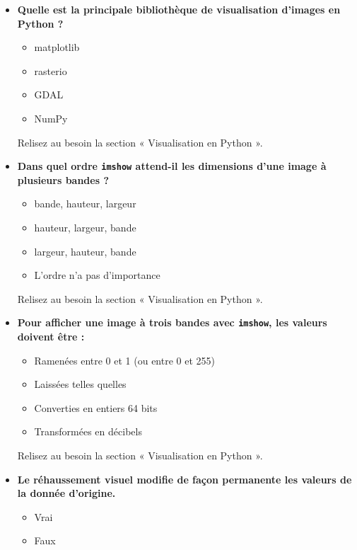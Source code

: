\documentclass[
  french,
  11pt,
  letterpaper,
  open=any,
  twoside=false,
  french]{scrbook}
\providecommand{\tightlist}{%
  \setlength{\itemsep}{0pt}\setlength{\parskip}{0pt}}
\begin{document}
\begin{itemize}
\item
  \textbf{Quelle est la principale bibliothèque de visualisation
  d'images en Python ?}

  \begin{itemize}
  \tightlist
  \item
    matplotlib
  \item
    rasterio
  \item
    GDAL
  \item
    NumPy
  \end{itemize}

  Relisez au besoin la section « Visualisation en Python ».
\item
  \textbf{Dans quel ordre \texttt{imshow} attend-il les dimensions d'une
  image à plusieurs bandes ?}

  \begin{itemize}
  \tightlist
  \item
    bande, hauteur, largeur
  \item
    hauteur, largeur, bande
  \item
    largeur, hauteur, bande
  \item
    L'ordre n'a pas d'importance
  \end{itemize}

  Relisez au besoin la section « Visualisation en Python ».
\item
  \textbf{Pour afficher une image à trois bandes avec \texttt{imshow},
  les valeurs doivent être :}

  \begin{itemize}
  \tightlist
  \item
    Ramenées entre 0 et 1 (ou entre 0 et 255)
  \item
    Laissées telles quelles
  \item
    Converties en entiers 64 bits
  \item
    Transformées en décibels
  \end{itemize}

  Relisez au besoin la section « Visualisation en Python ».
\item
  \textbf{Le réhaussement visuel modifie de façon permanente les valeurs
  de la donnée d'origine.}

  \begin{itemize}
  \tightlist
  \item
    Vrai
  \item
    Faux
  \end{itemize}


\end{itemize}
\end{document}

